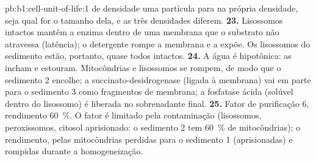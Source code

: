\begin{solution}{pb:b1:cell-unit-of-life:1}
de densidade uma partícula para na própria densidade, seja qual for o
tamanho dela, e as três densidades diferem.
\textbf{23.} Lisossomos intactos mantêm a enzima dentro de uma membrana
que o substrato não atravessa (latência); o detergente rompe a membrana
e a expõe. Os lisossomos do sedimento estão, portanto, quase todos
intactos.
\textbf{24.} A água é hipotônica: as  incham e estouram.
Mitocôndrias e lisossomos se rompem, de modo que o sedimento 2 encolhe;
a succinato-desidrogenase (ligada à membrana) vai em parte para o
sedimento 3 como fragmentos de membrana; a fosfatase ácida (solúvel
dentro do lisossomo) é liberada no sobrenadante final.
\textbf{25.} Fator de purificação $6$, rendimento \qty{60}{\%}. O fator
é limitado pela contaminação (lisossomos, peroxissomos, citosol
aprisionado: o sedimento 2 tem \qty{60}{\%} de mitocôndrias); o
rendimento, pelas mitocôndrias perdidas para o sedimento 1
(aprisionadas) e rompidas durante a homogeneização.
\end{solution}
